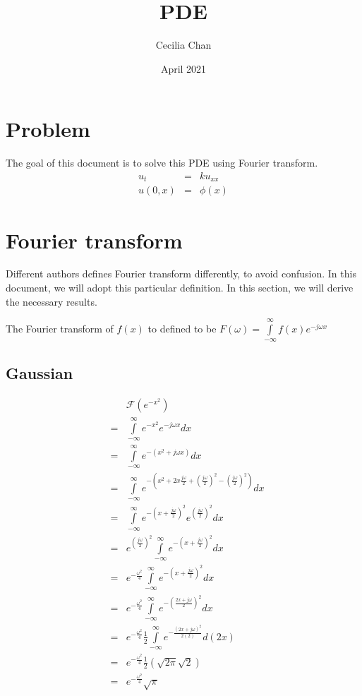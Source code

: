 \documentclass{article}
\title{PDE}
\author{Cecilia Chan}
\date{April 2021}
\begin{document}
\maketitle

\section*{Problem}
The goal of this document is to solve this PDE using Fourier transform.
\begin{eqnarray*}
      u_t &=& ku_{xx} \\
  u(0, x) &=& \phi(x)
\end{eqnarray*}

\section*{Fourier transform}
Different authors defines Fourier transform differently, to avoid confusion. In this document, we will adopt this particular definition. In this section, we will derive the necessary results.

The Fourier transform of $ f(x) $ to defined to be $ F(\omega) = \int\limits_{-\infty}^{\infty}f(x)e^{-j\omega x} $

\subsection*{Gaussian}

\begin{eqnarray*}
  & & \mathcal{F}(e^{-x^2}) \\
  &=& \int\limits_{-\infty}^{\infty}e^{-x^2}e^{-j\omega x}dx \\
  &=& \int\limits_{-\infty}^{\infty}e^{-(x^2+j\omega x)}dx \\
  &=& \int\limits_{-\infty}^{\infty}e^{-\left(x^2+2x\frac{j\omega }{2}+\left(\frac{j\omega}{2}\right)^2-\left(\frac{j\omega}{2}\right)^2\right)}dx \\
  &=& \int\limits_{-\infty}^{\infty}e^{-\left(x + \frac{j\omega}{2}\right)^2}e^{\left(\frac{j\omega}{2}\right)^2}dx \\  
  &=& e^{\left(\frac{j\omega}{2}\right)^2}\int\limits_{-\infty}^{\infty}e^{-\left(x + \frac{j\omega}{2}\right)^2}dx \\
  &=& e^{-\frac{\omega^2}{4}}\int\limits_{-\infty}^{\infty}e^{-\left(x + \frac{j\omega}{2}\right)^2}dx \\  
  &=& e^{-\frac{\omega^2}{4}}\int\limits_{-\infty}^{\infty}e^{-\left( \frac{2x + j\omega}{2}\right)^2}dx \\ 
  &=& e^{-\frac{\omega^2}{4}}\frac{1}{2}\int\limits_{-\infty}^{\infty}e^{-\frac{(2x + j\omega)^2}{2(2)}}d(2x) \\
  &=& e^{-\frac{\omega^2}{4}}\frac{1}{2}(\sqrt{2\pi}\sqrt{2}) \\
  &=& e^{-\frac{\omega^2}{4}}\sqrt{\pi}
\end{eqnarray*}
\end{document}
